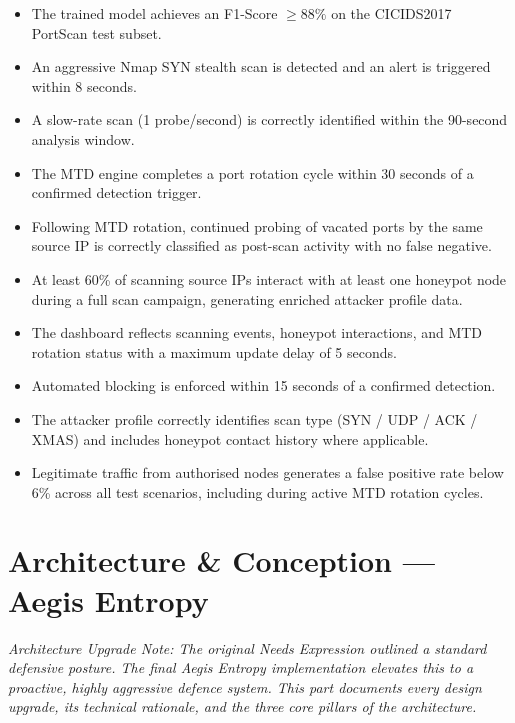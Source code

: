 \documentclass[12pt,a4paper]{report}
\begin{document}
\begin{itemize}[nosep, leftmargin=2em, label=$\checkmark$]
  \item The trained model achieves an F1-Score $\geq 88\%$ on the CICIDS2017 PortScan
        test subset.
  \item An aggressive Nmap SYN stealth scan is detected and an alert is triggered within
        8 seconds.
  \item A slow-rate scan (1 probe/second) is correctly identified within the 90-second
        analysis window.
  \item The MTD engine completes a port rotation cycle within 30 seconds of a confirmed
        detection trigger.
  \item Following MTD rotation, continued probing of vacated ports by the same source IP
        is correctly classified as post-scan activity with no false negative.
  \item At least 60\% of scanning source IPs interact with at least one honeypot node
        during a full scan campaign, generating enriched attacker profile data.
  \item The dashboard reflects scanning events, honeypot interactions, and MTD rotation
        status with a maximum update delay of 5 seconds.
  \item Automated blocking is enforced within 15 seconds of a confirmed detection.
  \item The attacker profile correctly identifies scan type (SYN / UDP / ACK / XMAS) and
        includes honeypot contact history where applicable.
  \item Legitimate traffic from authorised nodes generates a false positive rate below 6\%
        across all test scenarios, including during active MTD rotation cycles.
\end{itemize}

\part{Architecture \& Conception --- Aegis Entropy}

\textit{Architecture Upgrade Note: The original Needs Expression outlined a standard defensive
posture. The final Aegis Entropy implementation elevates this to a proactive, highly aggressive
defence system. This part documents every design upgrade, its technical rationale, and the
three core pillars of the architecture.}
\end{document}
